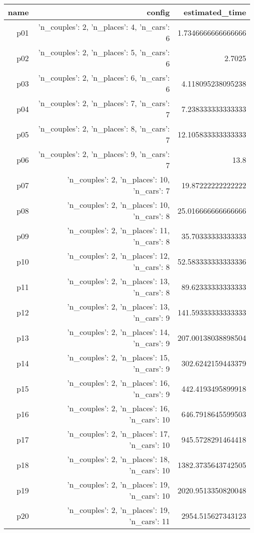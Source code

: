 \documentclass{article}
\begin{document}
                            \begin{center}
                            \scriptsize
                            \begin{tabular}{r|r|r}
                            name & config & estimated\_time\\\midrule
                              p01&{'n\_couples': 2, 'n\_places': 4, 'n\_cars': 6}&1.7346666666666666\\
  p02&{'n\_couples': 2, 'n\_places': 5, 'n\_cars': 6}&2.7025\\
  p03&{'n\_couples': 2, 'n\_places': 6, 'n\_cars': 6}&4.118095238095238\\
  p04&{'n\_couples': 2, 'n\_places': 7, 'n\_cars': 7}&7.238333333333333\\
  p05&{'n\_couples': 2, 'n\_places': 8, 'n\_cars': 7}&12.105833333333333\\
  p06&{'n\_couples': 2, 'n\_places': 9, 'n\_cars': 7}&13.8\\
  p07&{'n\_couples': 2, 'n\_places': 10, 'n\_cars': 7}&19.87222222222222\\
  p08&{'n\_couples': 2, 'n\_places': 10, 'n\_cars': 8}&25.016666666666666\\
  p09&{'n\_couples': 2, 'n\_places': 11, 'n\_cars': 8}&35.70333333333333\\
  p10&{'n\_couples': 2, 'n\_places': 12, 'n\_cars': 8}&52.583333333333336\\
  p11&{'n\_couples': 2, 'n\_places': 13, 'n\_cars': 8}&89.62333333333333\\
  p12&{'n\_couples': 2, 'n\_places': 13, 'n\_cars': 9}&141.59333333333333\\
  p13&{'n\_couples': 2, 'n\_places': 14, 'n\_cars': 9}&207.00138038898504\\
  p14&{'n\_couples': 2, 'n\_places': 15, 'n\_cars': 9}&302.6242159443379\\
  p15&{'n\_couples': 2, 'n\_places': 16, 'n\_cars': 9}&442.4193495899918\\
  p16&{'n\_couples': 2, 'n\_places': 16, 'n\_cars': 10}&646.7918645599503\\
  p17&{'n\_couples': 2, 'n\_places': 17, 'n\_cars': 10}&945.5728291464418\\
  p18&{'n\_couples': 2, 'n\_places': 18, 'n\_cars': 10}&1382.3735643742505\\
  p19&{'n\_couples': 2, 'n\_places': 19, 'n\_cars': 10}&2020.9513350820048\\
  p20&{'n\_couples': 2, 'n\_places': 19, 'n\_cars': 11}&2954.515627343123\\

\end{tabular}
\end{center}
\end{document}

